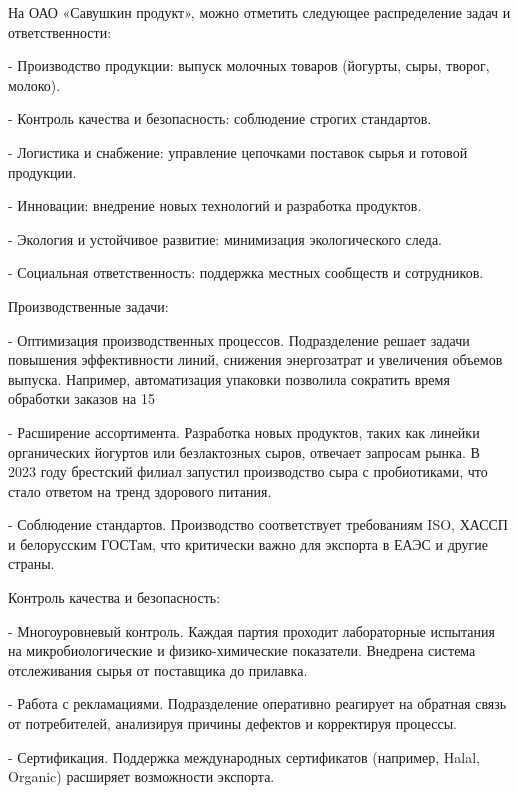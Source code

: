 {\gostFont

  \par \redline На ОАО «Савушкин продукт», можно отметить следующее распределение задач и ответственности:
  \par \redline - Производство продукции: выпуск молочных товаров (йогурты, сыры, творог, молоко).
  \par \redline - Контроль качества и безопасность: соблюдение строгих стандартов.
  \par \redline - Логистика и снабжение: управление цепочками поставок сырья и готовой продукции.
  \par \redline - Инновации: внедрение новых технологий и разработка продуктов.
  \par \redline - Экология и устойчивое развитие: минимизация экологического следа.
  \par \redline - Социальная ответственность: поддержка местных сообществ и сотрудников.

  \par \redline Производственные задачи:
  \par \redline - Оптимизация производственных процессов. Подразделение решает задачи повышения эффективности линий, снижения энергозатрат и увеличения объемов выпуска. Например, автоматизация упаковки позволила сократить время обработки заказов на 15%
  \par \redline - Расширение ассортимента. Разработка новых продуктов, таких как линейки органических йогуртов или безлактозных сыров, отвечает запросам рынка. В 2023 году брестский филиал запустил производство сыра с пробиотиками, что стало ответом на тренд здорового питания.
  \par \redline - Соблюдение стандартов. Производство соответствует требованиям ISO, ХАССП и белорусским ГОСТам, что критически важно для экспорта в ЕАЭС и другие страны.

  \par \redline Контроль качества и безопасность:
  \par \redline - Многоуровневый контроль. Каждая партия проходит лабораторные испытания на микробиологические и физико-химические показатели. Внедрена система отслеживания сырья от поставщика до прилавка.
  \par \redline - Работа с рекламациями. Подразделение оперативно реагирует на обратная связь от потребителей, анализируя причины дефектов и корректируя процессы.
  \par \redline - Сертификация. Поддержка международных сертификатов (например, Halal, Organic) расширяет возможности экспорта.

}
